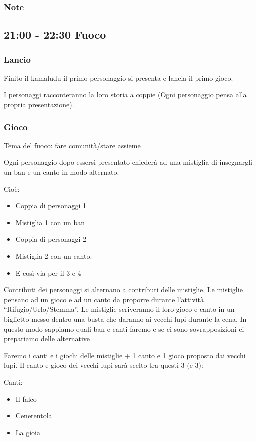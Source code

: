 \documentclass[../main.tex]{subfiles}
\begin{document}
        \subsubsection{Note}
        
    \subsection{21:00 - 22:30 Fuoco}
        \subsubsection{Lancio}
        Finito il kamaludu il primo personaggio si presenta e lancia il primo gioco.

        I personaggi racconteranno la loro storia a coppie (Ogni personaggio pensa alla propria presentazione).
        \subsubsection{Gioco}
        Tema del fuoco: fare comunità/stare assieme
        
        Ogni personaggio dopo essersi presentato chiederà ad una mistiglia di insegnargli un ban e un canto in modo alternato.

        Cioè:
        \begin{itemize}
            \item Coppia di personaggi 1
            \item Mistiglia 1 con un ban
            \item Coppia di personaggi  2
            \item Mistiglia 2 con un canto.
            \item E così via per il 3 e 4
        \end{itemize}

        Contributi dei personaggi si alternano a contributi delle mistiglie.
        Le mistiglie pensano ad un gioco e ad un canto da proporre durante l'attività “Rifugio/Urlo/Stemma”. Le mistiglie scriveranno il loro gioco e canto in un biglietto messo dentro una busta che daranno ai vecchi lupi durante la cena. In questo modo sappiamo quali ban e canti faremo e se ci sono sovrapposizioni ci prepariamo delle alternative

        Faremo i canti e i giochi delle mistiglie + 1 canto e 1 gioco proposto dai vecchi lupi.
        Il canto e gioco dei vecchi lupi sarà scelto tra questi 3 (e 3):
        
        Canti:
        \begin{itemize}
            \item Il falco
            \item Cenerentola
            \item La gioia
        \end{itemize}
\end{document}
